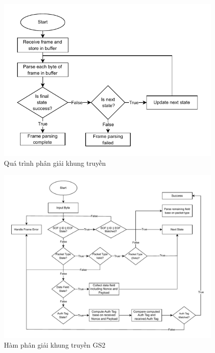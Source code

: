 \begin{figure}[H]
    \centering
    \includegraphics[width=0.7\linewidth]{frameparsing1.pdf}
    \caption{Quá trình phân giải khung truyền}
    \label{fig:parse-function}
\end{figure}

\begin{figure}[H]
    \centering
    \includegraphics[width=1\linewidth]{frameparse.pdf}
    \caption{Hàm phân giải khung truyền GS2}
    \label{fig:parsing}
\end{figure}

